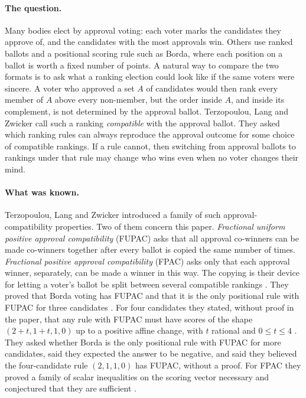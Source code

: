 \documentclass[11pt,a4paper]{article}
\theoremstyle{definition}
\theoremstyle{remark}
\begin{document}
\paragraph{The question.} Many bodies elect by approval voting: each voter marks the candidates they approve of, and the candidates with the most approvals win. Others use ranked ballots and a positional scoring rule such as Borda, where each position on a ballot is worth a fixed number of points. A natural way to compare the two formats is to ask what a ranking election could look like if the same voters were sincere. A voter who approved a set $A$ of candidates would then rank every member of $A$ above every non-member, but the order inside $A$, and inside its complement, is not determined by the approval ballot. Terzopoulou, Lang and Zwicker \cite{tlz} call such a ranking \emph{compatible} with the approval ballot. They asked which ranking rules can always reproduce the approval outcome for some choice of compatible rankings. If a rule cannot, then switching from approval ballots to rankings under that rule may change who wins even when no voter changes their mind.

\paragraph{What was known.} Terzopoulou, Lang and Zwicker \cite{tlz} introduced a family of such approval-compatibility properties. Two of them concern this paper. \emph{Fractional uniform positive approval compatibility} (FUPAC) asks that all approval co-winners can be made co-winners together after every ballot is copied the same number of times. \emph{Fractional positive approval compatibility} (FPAC) asks only that each approval winner, separately, can be made a winner in this way. The copying is their device for letting a voter's ballot be split between several compatible rankings \cite[Sect.~2.2]{tlz}. They proved that Borda voting has FUPAC and that it is the only positional rule with FUPAC for three candidates \cite[Theorem~3 and the remark after it]{tlz}. For four candidates they stated, without proof in the paper, that any rule with FUPAC must have scores of the shape $(2+t,1+t,1,0)$ up to a positive affine change, with $t$ rational and $0\le t\le4$ \cite[note~11]{tlz}. They asked whether Borda is the only positional rule with FUPAC for more candidates, said they expected the answer to be negative, and said they believed the four-candidate rule $(2,1,1,0)$ has FUPAC, without a proof. For FPAC they proved a family of scalar inequalities on the scoring vector necessary and conjectured that they are sufficient \cite[Lemma~2 and note~9]{tlz}.
\end{document}
